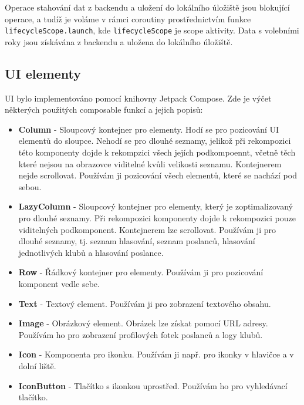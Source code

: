 \noindent Operace stahování dat z backendu a uložení do lokálního úložiště jsou blokující operace, a tudíž je voláme v rámci coroutiny prostřednictvím funkce \lstinline|lifecycleScope.launch|, kde \lstinline|lifecycleScope| je scope aktivity. Data s volebními roky jsou získávána z backendu a uložena do lokálního úložiště.

\subsection*{UI elementy}

UI bylo implementováno pomocí knihovny Jetpack Compose. Zde je výčet některých použitých composable funkcí a jejich popisů:


\begin{itemize}
	\item \textbf{Column} - Sloupcový kontejner pro elementy. Hodí se pro pozicování UI elementů do sloupce. Nehodí se pro dlouhé seznamy, jelikož při rekompozici této komponenty dojde k rekompzici všech jejích podkompoennt, včetně těch které nejsou na obrazovce viditelné kvůli velikosti seznamu. Kontejnerem nejde scrollovat. Používám ji pozicování všech elementů, které se nachází pod sebou.

	\item \textbf{LazyColumn} - Sloupcový kontejner pro elementy, který je zoptimalizovaný pro dlouhé seznamy. Při rekompozici komponenty dojde k rekompozici pouze viditelných podkomponent. Kontejnerem lze scrollovat. Používám ji pro dlouhé seznamy, tj. seznam hlasování, seznam poslanců, hlasování jednotlivých klubů a hlasování poslance.

	\item \textbf{Row} - Řádkový kontejner pro elementy. Používám ji pro pozicování komponent vedle sebe.

	\item \textbf{Text} - Textový element. Používám ji pro zobrazení textového obsahu.

	\item \textbf{Image} - Obrázkový element. Obrázek lze získat pomocí URL adresy. Používám ho pro zobrazení profilových fotek poslanců a logy klubů.

	\item \textbf{Icon} - Komponenta pro ikonku. Používám ji např. pro ikonky v hlavičce a v dolní liště.

	\item \textbf{IconButton} - Tlačítko s ikonkou uprostřed. Používám ho pro vyhledávací tlačítko.


\end{itemize}
